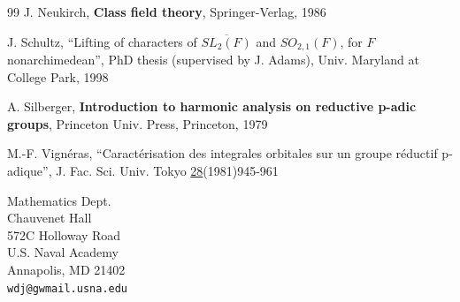 \documentclass[twocolumn,10pt]{article}
\begin{document}
\begin{thebibliography}{99}
 J. Neukirch, {\bf Class field theory},
Springer-Verlag, 1986

 J. Schultz, ``Lifting of characters of 
$\overline{SL_2(F)}$ and
$SO_{2,1}(F)$, for $F$ nonarchimedean'',
PhD thesis (supervised by J. Adams),
Univ. Maryland at College Park, 1998

 A. Silberger, {\bf Introduction to
harmonic analysis on reductive p-adic groups}, 
Princeton Univ. Press, Princeton, 1979

 M.-F. Vign\'eras, ``Caract\'erisation des integrales 
orbitales sur un
groupe r\'eductif p-adique'', J. Fac. Sci. Univ. Tokyo 
\underline{28}(1981)945-961

\end{thebibliography}

\vskip 1in
\noindent
Mathematics Dept.\\
Chauvenet Hall\\
572C Holloway Road\\
U.S. Naval Academy\\
Annapolis, MD 21402\\
\verb+wdj@gwmail.usna.edu+
\end{document}
